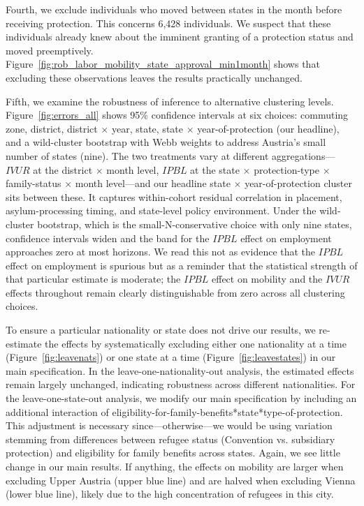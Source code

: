 Fourth, we exclude individuals who moved between states in the month before receiving protection. This concerns 6,428 individuals. We suspect that these individuals already knew about the imminent granting of a protection status and moved preemptively. Figure~\ref{fig:rob_labor_mobility_state_approval_min1month} shows that excluding these observations leaves the results practically unchanged.

Fifth, we examine the robustness of inference to alternative clustering levels. Figure~\ref{fig:errors_all} shows 95\% confidence intervals at six choices: commuting zone, district, district $\times$ year, state, state $\times$ year-of-protection (our headline), and a wild-cluster bootstrap with Webb weights to address Austria's small number of states (nine). The two treatments vary at different aggregations---$IVUR$ at the district $\times$ month level, $IPBL$ at the state $\times$ protection-type $\times$ family-status $\times$ month level---and our headline state $\times$ year-of-protection cluster sits between these. It captures within-cohort residual correlation in placement, asylum-processing timing, and state-level policy environment. Under the wild-cluster bootstrap, which is the small-N-conservative choice with only nine states, confidence intervals widen and the band for the $IPBL$ effect on employment approaches zero at most horizons. We read this not as evidence that the $IPBL$ effect on employment is spurious but as a reminder that the statistical strength of that particular estimate is moderate; the $IPBL$ effect on mobility and the $IVUR$ effects throughout remain clearly distinguishable from zero across all clustering choices.

To ensure a particular nationality or state does not drive our results, we re-estimate the effects by systematically excluding either one nationality at a time (Figure~\ref{fig:leavenats}) or one state at a time (Figure~\ref{fig:leavestates}) in our main specification. In the leave-one-nationality-out analysis, the estimated effects remain largely unchanged, indicating robustness across different nationalities.
For the leave-one-state-out analysis, we modify our main specification by including an additional interaction of eligibility-for-family-benefits*state*type-of-protection. This adjustment is necessary since---otherwise---we would be using variation stemming from differences between refugee status (Convention vs. subsidiary protection) and eligibility for family benefits across states.  
Again, we see little change in our main results. If anything, the effects on mobility are larger when excluding Upper Austria (upper blue line) and are halved when excluding Vienna (lower blue line), likely due to the high concentration of refugees in this city.   

